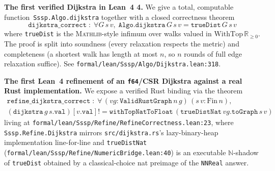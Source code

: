 \documentclass[11pt,a4paper]{article}
\makeatletter
\let\enitfb@enumerate\enumerate
\let\enitfb@endenumerate\endenumerate
\renewenvironment{enumerate}[1][]{\enitfb@enumerate}{\enitfb@endenumerate}%
\newcommand{\Lean}{Lean~4\xspace}
\newcommand{\Mathlib}{\textsc{Mathlib}\xspace}
\newcommand{\Dijkstra}{Dijkstra\xspace}
\newcommand{\code}[1]{\texttt{#1}}
\theoremstyle{plain}
\theoremstyle{definition}
\makeatother
\begin{document}
\begin{enumerate}[leftmargin=2.2em,itemsep=0.35em]
\item \textbf{The first verified \Dijkstra{} in \Lean{} 4.}
      We give a total, computable function~\code{Sssp.Algo.dijkstra} together
      with a closed correctness theorem
      \[
        \code{dijkstra\_correct}\;:\;
        \forall G\,s\,v,\;
        \code{Algo.dijkstra}\,G\,s\,v
        = \code{trueDist}\,G\,s\,v
      \]
      where \code{trueDist} is the \Mathlib-style infimum over walks valued
      in $\mathrm{WithTop}\,\mathbb{R}_{\geq 0}$. The proof is split into
      soundness (every relaxation respects the metric) and completeness (a
      shortest walk has length at most $n$, so $n$ rounds of full edge
      relaxation suffice). See
      \code{formal/lean/Sssp/Algo/Dijkstra.lean:318}.

\item \textbf{The first \Lean{} refinement of an \code{f64}/CSR \Dijkstra{}
      against a real Rust implementation.}
      We expose a verified Rust binding via the theorem
      \begin{multline*}
        \code{refine\_dijkstra\_correct}\;:\;
        \forall\, (vg : \code{ValidRustGraph}\,n\,g)\,(s\,v : \mathrm{Fin}\,n),\\
        (\code{dijkstra}\,g\,s.\code{val})[v.\code{val}]!
          = \code{withTopNatToFloat}\,(\code{trueDistNat}\,vg.\code{toGraph}\,s\,v)
      \end{multline*}
      living at \code{formal/lean/Sssp/Refine/RefineCorrectness.lean:23},
      where \code{Sssp.Refine.Dijkstra} mirrors \code{src/dijkstra.rs}'s
      lazy-binary-heap implementation line-for-line and \code{trueDistNat}
      (\code{formal/lean/Sssp/Refine/NumericBridge.lean:40}) is an executable
      $\mathbb{N}$-shadow of \code{trueDist} obtained by a classical-choice
      nat preimage of the \code{NNReal} answer.


\end{enumerate}
\end{document}
